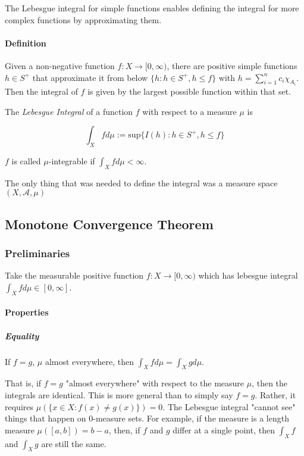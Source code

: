 The Lebesgue integral for simple functions enables defining the integral for more complex functions by approximating them.

\paragraph{Definition} 
Given a non-negative function $f:X \rightarrow [0,\infty)$, there are positive simple functions $h\in S^+$ that approximate it from below $\{h: h\in S^+, h\leq f\}$ with $h=\sum_{i=1}^n c_i \chi_{A_i}$. Then the integral of $f$ is given by the largest possible function within that set.

The \textit{Lebesgue Integral} of a function $f$ with respect to a measure $\mu$ is

\begin{equation}
\int_X f d\mu := \mathrm{sup}\{ I(h) : h\in S^+, h\leq f \}
\end{equation}

$f$ is called $\mu$-integrable if $\int_X f d\mu < \infty$.

The only thing that was needed to define the integral was a measure space $(X,\mathscr{A},\mu)$


\subsection{Monotone Convergence Theorem}

\subsubsection{Preliminaries}

Take the measurable positive function $f: X\rightarrow [0,\infty)$ which has lebesgue integral $\int_X f d\mu \in [0,\infty]$. 

\paragraph{Properties}

\subparagraph{Equality}
If $f=g$, $\mu$ almost everywhere, then $\int_X f d\mu = \int_X g d\mu$. 

That is, if $f=g$ "almost everywhere" with respect to the measure $\mu$, then the integrals are identical. This is more general than to simply say $f=g$. Rather, it requires $\mu(\{x \in X: f(x) \neq g(x) \}) = 0$. The Lebesgue integral "cannot see" things that happen on $0$-measure sets. For example, if the measure is a length measure $\mu ( [a,b] ) = b-a$, then, if $f$ and $g$ differ at a single point, then $\int_X f $ and $\int_X g$ are still the same. 

